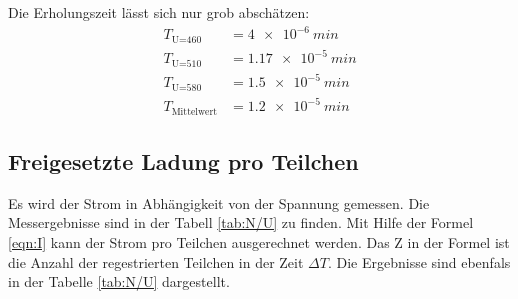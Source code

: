 Die Erholungszeit lässt sich nur grob abschätzen:
\begin{align*}
  T_{\text{U=460}}&=\SI{4e-6}{min}\\
  T_{\text{U=510}}&=\SI{1,17e-5}{min}\\
  T_{\text{U=580}}&=\SI{1,5e-5}{min}\\
  T_{\text{Mittelwert}}&=\SI{1,2e-5}{min}
\end{align*}

\subsection{Freigesetzte Ladung pro Teilchen}
Es wird der Strom in Abhängigkeit von der Spannung gemessen. Die Messergebnisse sind in der Tabell \ref{tab:N/U} zu finden.
Mit Hilfe der Formel \ref{eqn:I} kann der Strom pro Teilchen ausgerechnet werden. Das Z in der Formel ist die Anzahl der regestrierten Teilchen in der Zeit $\Delta T$.
Die Ergebnisse sind ebenfals in der Tabelle \ref{tab:N/U} dargestellt.
